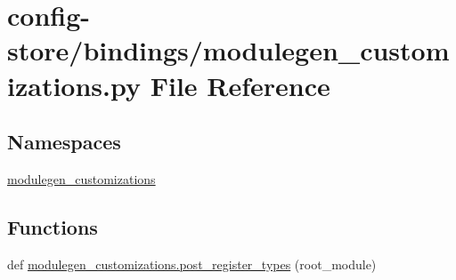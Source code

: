 \hypertarget{config-store_2bindings_2modulegen__customizations_8py}{}\section{config-\/store/bindings/modulegen\+\_\+customizations.py File Reference}
\label{config-store_2bindings_2modulegen__customizations_8py}
\subsection*{Namespaces}
\begin{DoxyCompactItemize}
\item 
 \hyperlink{namespacemodulegen__customizations}{modulegen\+\_\+customizations}
\end{DoxyCompactItemize}
\subsection*{Functions}
\begin{DoxyCompactItemize}
\item 
def \hyperlink{namespacemodulegen__customizations_a752cb066e8de8ee88028481335101ec9}{modulegen\+\_\+customizations.\+post\+\_\+register\+\_\+types} (root\+\_\+module)
\end{DoxyCompactItemize}
